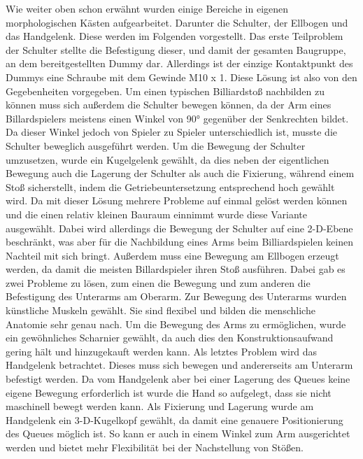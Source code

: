	Wie weiter oben schon erwähnt wurden einige Bereiche in eigenen morphologischen Kästen aufgearbeitet.
	Darunter die Schulter, der Ellbogen und das Handgelenk.
	Diese werden im Folgenden vorgestellt. 
	Das erste Teilproblem der Schulter stellte die Befestigung dieser, und damit der gesamten Baugruppe, an dem bereitgestellten Dummy dar.
	Allerdings ist der einzige Kontaktpunkt des Dummys eine Schraube mit dem Gewinde M10 x 1.
	Diese Lösung ist also von den Gegebenheiten vorgegeben. 
	Um einen typischen Billiardstoß nachbilden zu können muss sich außerdem die Schulter bewegen können, da der Arm eines Billardspielers meistens einen Winkel von 90° gegenüber der Senkrechten bildet.
	Da dieser Winkel jedoch von Spieler zu Spieler unterschiedlich ist, musste die Schulter beweglich ausgeführt werden. Um die Bewegung der Schulter umzusetzen, wurde ein Kugelgelenk gewählt, da dies neben der eigentlichen Bewegung auch die Lagerung der Schulter als auch die Fixierung, während einem Stoß sicherstellt, indem die Getriebeuntersetzung entsprechend hoch gewählt wird.
	Da mit dieser Lösung mehrere Probleme auf einmal gelöst werden können und die einen relativ kleinen Bauraum einnimmt wurde diese Variante ausgewählt.
	Dabei wird allerdings die Bewegung der Schulter auf eine 2-D-Ebene beschränkt, was aber für die Nachbildung eines Arms beim Billiardspielen keinen Nachteil mit sich bringt. 
	Außerdem muss eine Bewegung am Ellbogen erzeugt werden, da damit die meisten Billardspieler ihren Stoß ausführen.
	Dabei gab es zwei Probleme zu lösen, zum einen die Bewegung und zum anderen die Befestigung des Unterarms am Oberarm.
	Zur Bewegung des Unterarms wurden künstliche Muskeln gewählt.
	Sie sind flexibel und bilden die menschliche Anatomie sehr genau nach.
	Um die Bewegung des Arms zu ermöglichen, wurde ein gewöhnliches Scharnier gewählt, da auch dies den Konstruktionsaufwand gering hält und hinzugekauft werden kann. 
	Als letztes Problem wird das Handgelenk betrachtet.
	Dieses muss sich bewegen und andererseits am Unterarm befestigt werden.
	Da vom Handgelenk aber bei einer Lagerung des Queues keine eigene Bewegung erforderlich ist wurde die Hand so aufgelegt, dass sie nicht maschinell bewegt werden kann.
	Als Fixierung und Lagerung wurde am Handgelenk ein 3-D-Kugelkopf gewählt, da damit eine genauere Positionierung des Queues möglich ist.
	So kann er auch in einem Winkel zum Arm ausgerichtet werden und bietet mehr Flexibilität bei der Nachstellung von Stößen.